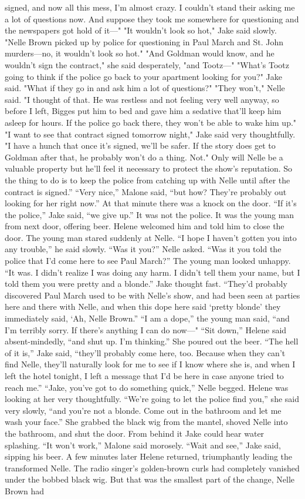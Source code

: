 \documentclass{novel}
\begin{document}
signed, and now all this mess, I’m almost crazy. I couldn’t stand their asking me a lot of questions now. And suppose they took me somewhere for questioning and the newspapers got hold of it—" "It wouldn’t look so hot," Jake said slowly. "Nelle Brown picked up by police for questioning in Paul March and St. John murders—no, it wouldn’t look so hot." "And Goldman would know, and he wouldn’t sign the contract," she said desperately, "and Tootz—" "What’s Tootz going to think if the police go back to your apartment looking for you?" Jake said. "What if they go in and ask him a lot of questions?" "They won’t," Nelle said. "I thought of that. He was restless and not feeling very well anyway, so before I left, Bigges put him to bed and gave him a sedative that’ll keep him asleep for hours. If the police go back there, they won’t be able to wake him up." "I want to see that contract signed tomorrow night," Jake said very thoughtfully. "I have a hunch that once it’s signed, we’ll be safer. If the story does get to Goldman after that, he probably won’t do a thing. Not." Only will Nelle be a valuable property but he’ll feel it necessary to protect the show’s reputation. So the thing to do is to keep the police from catching up with Nelle until after the contract is signed.” “Very nice,” Malone said, “but how? They’re probably out looking for her right now.” At that minute there was a knock on the door. “If it’s the police,” Jake said, “we give up.” It was not the police. It was the young man from next door, offering beer. Helene welcomed him and told him to close the door. The young man stared suddenly at Nelle. “I hope I haven’t gotten you into any trouble,” he said slowly. “Was it you?” Nelle asked. “Was it you told the police that I’d come here to see Paul March?” The young man looked unhappy. “It was. I didn’t realize I was doing any harm. I didn’t tell them your name, but I told them you were pretty and a blonde.” Jake thought fast. “They’d probably discovered Paul March used to be with Nelle’s show, and had been seen at parties here and there with Nelle, and when this dope here said ‘pretty blonde’ they immediately said, ‘Ah, Nelle Brown.” “I am a dope,” the young man said, “and I’m terribly sorry. If there’s anything I can do now—" “Sit down,” Helene said absent-mindedly, “and shut up. I’m thinking.” She poured out the beer. “The hell of it is,” Jake said, “they’ll probably come here, too. Because when they can’t find Nelle, they’ll naturally look for me to see if I know where she is, and when I left the hotel tonight, I left a message that I’d be here in case anyone tried to reach me.” “Jake, you’ve got to do something quick,” Nelle begged. Helene was looking at her very thoughtfully. “We’re going to let the police find you,” she said very slowly, “and you’re not a blonde. Come out in the bathroom and let me wash your face.” She grabbed the black wig from the mantel, shoved Nelle into the bathroom, and shut the door. From behind it Jake could hear water splashing. “It won’t work,” Malone said morosely. “Wait and see,” Jake said, sipping his beer. A few minutes later Helene returned, triumphantly leading the transformed Nelle. The radio singer’s golden-brown curls had completely vanished under the bobbed black wig. But that was the smallest part of the change, Nelle Brown had 
\end{document}

